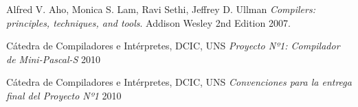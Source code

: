 \documentclass[a4paper,oneside]{report}
\begin{document}
\begin{thebibliography}{9}
  Alfred V. Aho, Monica S. Lam, Ravi Sethi, Jeffrey D. Ullman
  \emph{Compilers: principles, techniques, and tools}.
  Addison Wesley
  2nd Edition
  2007.
  
	Cátedra de Compiladores e Intérpretes, DCIC, UNS
	\emph{Proyecto Nº1: Compilador de Mini-Pascal-S}
	2010
	
	Cátedra de Compiladores e Intérpretes, DCIC, UNS
	\emph{Convenciones para la entrega final del Proyecto Nº1}
	2010

\end{thebibliography}
\end{document}
